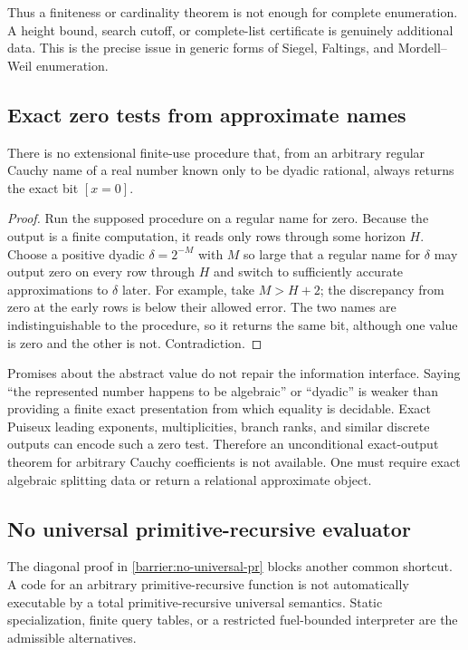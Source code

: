 Thus a finiteness or cardinality theorem is not enough for complete enumeration.  A
height bound, search cutoff, or complete-list certificate is genuinely additional
data.  This is the precise issue in generic forms of Siegel, Faltings, and
Mordell--Weil enumeration.

\subsection{Exact zero tests from approximate names}

\begin{barrier}
\label{barrier:zero-test}
There is no extensional finite-use procedure that, from an arbitrary regular Cauchy
name of a real number known only to be dyadic rational, always returns the exact bit
\([x=0]\).
\end{barrier}

\begin{proof}
Run the supposed procedure on a regular name for zero.  Because the output is a finite
computation, it reads only rows through some horizon \(H\).  Choose a positive dyadic
\(\delta=2^{-M}\) with \(M\) so large that a regular name for \(\delta\) may output
zero on every row through \(H\) and switch to sufficiently accurate approximations to
\(\delta\) later.  For example, take \(M>H+2\); the discrepancy from zero at the early
rows is below their allowed error.  The two names are indistinguishable to the
procedure, so it returns the same bit, although one value is zero and the other is not.
Contradiction.
\end{proof}

Promises about the abstract value do not repair the information interface.  Saying
``the represented number happens to be algebraic'' or ``dyadic'' is weaker than
providing a finite exact presentation from which equality is decidable.  Exact Puiseux
leading exponents, multiplicities, branch ranks, and similar discrete outputs can
encode such a zero test.  Therefore an unconditional exact-output theorem for arbitrary
Cauchy coefficients is not available.  One must require exact algebraic splitting
data or return a relational approximate object.

\subsection{No universal primitive-recursive evaluator}

The diagonal proof in \cref{barrier:no-universal-pr} blocks another common shortcut.
A code for an arbitrary primitive-recursive function is not automatically executable
by a total primitive-recursive universal semantics.  Static specialization, finite
query tables, or a restricted fuel-bounded interpreter are the admissible alternatives.

